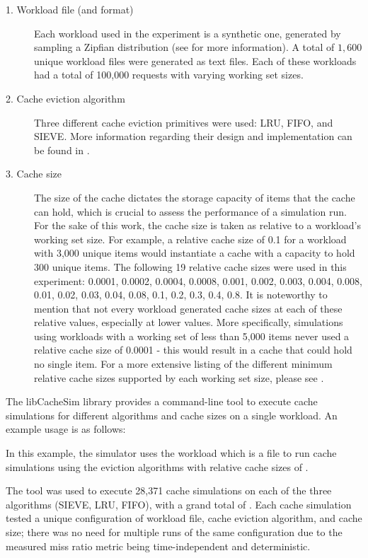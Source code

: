 \begin{description}
    \item [1. Workload file (and format)] Each workload used in the experiment is a synthetic one, generated by sampling a Zipfian distribution (see  for more information). A total of $1,600$ unique workload files were generated as text files. Each of these workloads had a total of 100,000 requests with varying working set sizes.
    \item [2. Cache eviction algorithm] Three different cache eviction primitives were used: LRU, FIFO, and SIEVE. More information regarding their design and implementation can be found in .
    \item [3. Cache size] The size of the cache dictates the storage capacity of items that the cache can hold, which is crucial to assess the performance of a simulation run. For the sake of this work, the cache size is taken as relative to a workload's working set size. For example, a relative cache size of 0.1 for a workload with 3,000 unique items would instantiate a cache with a capacity to hold 300 unique items. The following 19 relative cache sizes were used in this experiment: 0.0001, 0.0002, 0.0004, 0.0008, 0.001, 0.002, 0.003, 0.004, 0.008, 0.01, 0.02, 0.03, 0.04, 0.08, 0.1, 0.2, 0.3, 0.4, 0.8. It is noteworthy to mention that not every workload generated cache sizes at each of these relative values, especially at lower values. More specifically, simulations using workloads with a working set of less than 5,000 items never used a relative cache size of 0.0001 - this would result in a cache that could hold no single item. For a more extensive listing of the different minimum relative cache sizes supported by each working set size, please see .
\end{description}

The libCacheSim library provides a command-line tool to execute cache simulations for different algorithms and cache sizes on a single workload. An example usage is as follows:



In this example, the simulator  uses the workload  which is a  file to run cache simulations using the eviction algorithms  with relative cache sizes of .

The  tool was used to execute 28,371 cache simulations on each of the three algorithms (SIEVE, LRU, FIFO), with a grand total of . Each cache simulation tested a unique configuration of workload file, cache eviction algorithm, and cache size; there was no need for multiple runs of the same configuration due to the measured miss ratio metric being time-independent and deterministic.

